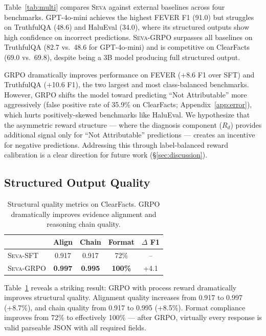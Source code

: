 \documentclass[11pt]{article}
\newcommand{\seva}{\textsc{Seva}\xspace}
\newcommand{\realnumber}[1]{\textbf{#1}}
\begin{document}
Table~\ref{tab:multi} compares \seva against external baselines across four benchmarks.
GPT-4o-mini achieves the highest FEVER F1 (91.0) but struggles on TruthfulQA (48.6) and HaluEval (34.0), where its structured outputs show high confidence on incorrect predictions.
\seva-GRPO surpasses all baselines on TruthfulQA (82.7 vs.\ 48.6 for GPT-4o-mini) and is competitive on ClearFacts (69.0 vs.\ 69.8), despite being a 3B model producing full structured output.

GRPO dramatically improves performance on FEVER (+8.6 F1 over SFT) and TruthfulQA (+10.6 F1), the two largest and most class-balanced benchmarks.
However, GRPO shifts the model toward predicting ``Not Attributable'' more aggressively (false positive rate of 35.9\% on ClearFacts; Appendix~\ref{app:error}), which hurts positively-skewed benchmarks like HaluEval.
We hypothesize that the asymmetric reward structure --- where the diagnosis component ($R_d$) provides additional signal only for ``Not Attributable'' predictions --- creates an incentive for negative predictions.
Addressing this through label-balanced reward calibration is a clear direction for future work (\S\ref{sec:discussion}).


\subsection{Structured Output Quality}

\begin{table}[t]
\centering
\small
\caption{Structural quality metrics on ClearFacts. GRPO dramatically improves evidence alignment and reasoning chain quality.}
\label{tab:structure}
\begin{tabular}{lcccc}
\toprule
 & \textbf{Align} & \textbf{Chain} & \textbf{Format} & \textbf{$\Delta$ F1} \\
\midrule
\seva-SFT & 0.917 & 0.917 & 72\% & -- \\
\seva-GRPO & \realnumber{0.997} & \realnumber{0.995} & \realnumber{100\%} & +4.1 \\
\bottomrule
\end{tabular}
\end{table}

Table~\ref{tab:structure} reveals a striking result: GRPO with process reward dramatically improves structural quality.
Alignment quality increases from 0.917 to 0.997 (+8.7\%), and chain quality from 0.917 to 0.995 (+8.5\%).
Format compliance improves from 72\% to effectively 100\% --- after GRPO, virtually every response is valid parseable JSON with all required fields.
\end{document}
